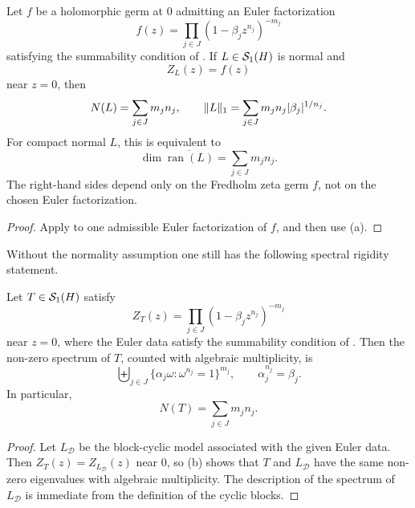 \begin{corollary}
  \label{cor:determinant-intrinsic-normal-data}
  Let \(f\) be a holomorphic germ at \(0\) admitting an Euler
  factorization
  \[
    f(z)=\prod_{j\in J}(1-\beta_j z^{n_j})^{-m_j}
  \]
  satisfying the summability condition of
  . If \(L\in\mathcal S_1(H)\) is normal
  and
  \[
    Z_L(z)=f(z)
  \]
  near \(z=0\), then
  \[
    N(L)=\sum_{j\in J}m_jn_j,
    \qquad
    \|L\|_1=\sum_{j\in J}m_jn_j\lvert \beta_j \rvert^{1/n_j}.
  \]
  For compact normal \(L\), this is equivalent to
  \[
    \dim\overline{\operatorname{ran}(L)}=\sum_{j\in J}m_jn_j.
  \]
  The right-hand sides depend only on the Fredholm zeta germ \(f\), not
  on the chosen Euler factorization.
\end{corollary}

\begin{proof}
  Apply  to one admissible Euler
  factorization of \(f\), and then use
  \textup{(a)}.
\end{proof}

Without the normality assumption one still has the following spectral
rigidity statement.

\begin{proposition}
  \label{thm:general-support-optimality}
  Let \(T\in \mathcal S_1(H)\) satisfy
  \[
    Z_T(z)
    =\prod_{j\in J}(1-\beta_j z^{n_j})^{-m_j}
  \]
  near \(z=0\), where the Euler data satisfy the summability condition
  of . Then the non-zero spectrum
  of \(T\), counted with algebraic multiplicity, is
  \[
    \biguplus_{j\in J}\bigl\{\alpha_j\omega:\omega^{n_j}=1\bigr\}^{m_j},
    \qquad
    \alpha_j^{n_j}=\beta_j.
  \]
  In particular,
  \[
    N(T)=\sum_{j\in J}m_jn_j.
  \]
\end{proposition}

\begin{proof}
  Let \(L_{\mathcal D}\) be the block-cyclic model associated with the
  given Euler data. Then
  \(Z_T(z)=Z_{L_{\mathcal D}}(z)\) near \(0\), so
  \textup{(b)} shows that
  \(T\) and \(L_{\mathcal D}\) have the same non-zero eigenvalues with
  algebraic multiplicity. The description of the spectrum of
  \(L_{\mathcal D}\) is immediate from the definition of the cyclic
  blocks.
\end{proof}


